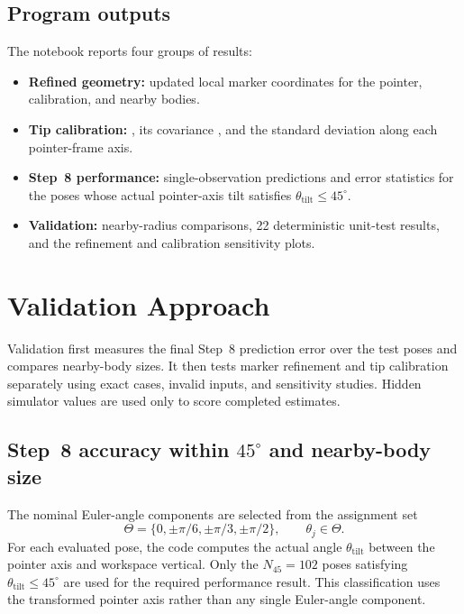 \documentclass[11pt]{article}
\begin{document}
\subsection{Program outputs}
The notebook reports four groups of results:
\begin{itemize}
\setlength{\itemsep}{2pt}
\item \textbf{Refined geometry:} updated local marker coordinates for the pointer, calibration, and nearby bodies.
\item \textbf{Tip calibration:} , its covariance , and the standard deviation along each pointer-frame axis.
\item \textbf{Step~8 performance:} single-observation predictions and error statistics for the poses whose actual pointer-axis tilt satisfies $\theta_{\mathrm{tilt}}\leq45^\circ$.
\item \textbf{Validation:} nearby-radius comparisons, 22 deterministic unit-test results, and the refinement and calibration sensitivity plots.
\end{itemize}


\section{Validation Approach}
Validation first measures the final Step~8 prediction error over the test
poses and compares nearby-body sizes.  It then tests marker refinement and tip
calibration separately using exact cases, invalid inputs, and sensitivity
studies.  Hidden simulator values are used only to score completed estimates.

\subsection{Step~8 accuracy within $45^\circ$ and nearby-body size}
The nominal Euler-angle components are selected from the assignment set
\begin{equation}
\Theta=\{0,\pm\pi/6,\pm\pi/3,\pm\pi/2\},
\qquad \theta_j\in\Theta.
\end{equation}
For each evaluated pose, the code computes the actual angle
$\theta_{\mathrm{tilt}}$ between the pointer axis and workspace vertical.
Only the $N_{45}=102$ poses satisfying
$\theta_{\mathrm{tilt}}\leq45^\circ$ are used for the required performance
result.  This classification uses the transformed pointer axis rather than any
single Euler-angle component.
\end{document}
